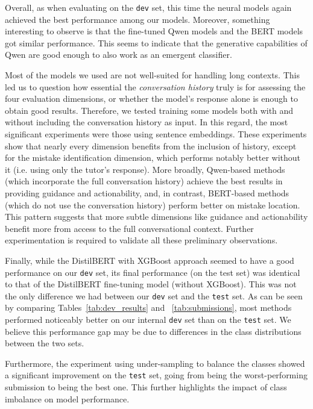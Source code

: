 \documentclass[11pt]{article}
\begin{document}
Overall, as when evaluating on the \texttt{dev} set, this time the neural models again achieved the best performance among our models.
Moreover, something interesting to observe is that the fine-tuned Qwen models and the BERT models got similar performance. 
This seems to indicate that the generative capabilities of Qwen are good enough to also work as an emergent classifier.

Most of the models we used are not well-suited for handling long contexts.
This led us to question how essential the \textit{conversation history} truly is for assessing the four evaluation dimensions, or whether the model's response alone is enough to obtain good results.
Therefore, we tested training some models both with and without including the conversation history as input.
In this regard, the most significant experiments were those using sentence embeddings.
These experiments show that nearly every dimension benefits from the inclusion of history, except for the mistake identification dimension, which performs notably better without it (i.e. using only the tutor's response).
More broadly, Qwen-based methods (which incorporate the full conversation history) achieve the best results in providing guidance and actionability, and, in contrast, BERT-based methods (which do not use the conversation history) perform better on mistake location.
This pattern suggests that more subtle dimensions like guidance and actionability benefit more from access to the full conversational context.
Further experimentation is required to validate all these preliminary observations.






Finally, while the DistilBERT with XGBoost approach seemed to have a good performance on our \texttt{dev} set, its final performance (on the test set) was identical to that of the DistilBERT fine-tuning model (without XGBoost).
This was not the only difference we had between our \texttt{dev} set and the \texttt{test} set.
As can be seen by comparing Tables~\ref{tab:dev_results} and ~\ref{tab:submissions}, most methods performed noticeably better on our internal \texttt{dev} set than on the \texttt{test} set.
We believe this performance gap may be due to differences in the class distributions between the two sets.

Furthermore, the experiment using under-sampling to balance the classes showed a significant improvement on the \texttt{test} set, going from being the worst-performing submission to being the best one.
This further highlights the impact of class imbalance on model performance.
\end{document}
